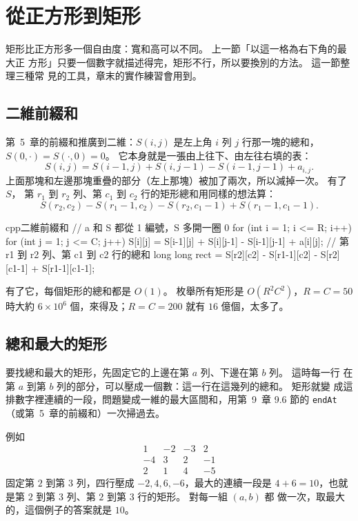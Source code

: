 \section{從正方形到矩形}
\label{sec:dp2-rect}

矩形比正方形多一個自由度：寬和高可以不同。 上一節「以這一格為右下角的最大正
方形」只要一個數字就描述得完，矩形不行，所以要換別的方法。 這一節整理三種常
見的工具，章末的實作練習會用到。

\subsection{二維前綴和}
\label{sec:dp2-prefix2d}

第~5~章的前綴和推廣到二維：$S(i, j)$ 是左上角 $i$ 列 $j$ 行那一塊的總和，
$S(0, \cdot) = S(\cdot, 0) = 0$。 它本身就是一張由上往下、由左往右填的表：
\[
S(i, j) = S(i - 1, j) + S(i, j - 1) - S(i - 1, j - 1) + a_{i,j}.
\]
上面那塊和左邊那塊重疊的部分（左上那塊）被加了兩次，所以減掉一次。 有了 $S$，
第 $r_1$ 到 $r_2$ 列、第 $c_1$ 到 $c_2$ 行的矩形總和用同樣的想法算：
\[
S(r_2, c_2) - S(r_1 - 1, c_2) - S(r_2, c_1 - 1) + S(r_1 - 1, c_1 - 1).
\]
\begin{code}{cpp}{二維前綴和}
// a 和 S 都從 1 編號，S 多開一圈 0
for (int i = 1; i <= R; i++) {
    for (int j = 1; j <= C; j++) {
        S[i][j] = S[i-1][j] + S[i][j-1] - S[i-1][j-1] + a[i][j];
    }
}
// 第 r1 到 r2 列、第 c1 到 c2 行的總和
long long rect = S[r2][c2] - S[r1-1][c2]
               - S[r2][c1-1] + S[r1-1][c1-1];
\end{code}
有了它，每個矩形的總和都是 $O(1)$。 枚舉所有矩形是 $O(R^2 C^2)$，$R = C = 50$
時大約 $6 \times 10^6$ 個，來得及；$R = C = 200$ 就有 $16$ 億個，太多了。

\subsection{總和最大的矩形}
\label{sec:dp2-maxrect}

要找總和最大的矩形，先固定它的上邊在第 $a$ 列、下邊在第 $b$ 列。 這時每一行
在第 $a$ 到第 $b$ 列的部分，可以壓成一個數：這一行在這幾列的總和。 矩形就變
成這排數字裡連續的一段，問題變成一維的最大區間和，用第~9~章 9.6 節的 \texttt{endAt}（或第~5~章的前綴和）一次掃過去。

例如
\[
\begin{matrix}
1 & -2 & -3 & 2 \\
-4 & 3 & 2 & -1 \\
2 & 1 & 4 & -5
\end{matrix}
\]
固定第 $2$ 到第 $3$ 列，四行壓成 $-2, 4, 6, -6$，最大的連續一段是 $4 + 6 =
10$，也就是第 $2$ 到第 $3$ 列、第 $2$ 到第 $3$ 行的矩形。 對每一組 $(a, b)$ 都
做一次，取最大的，這個例子的答案就是 $10$。

